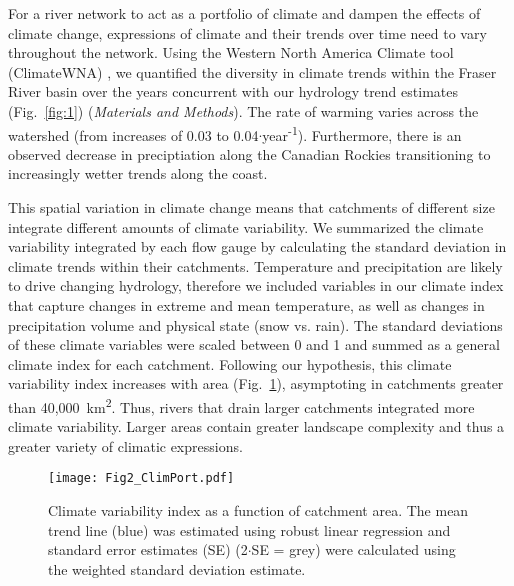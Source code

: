 \documentclass[9pt,twocolumn,twoside,lineno]{pnas-new}
\begin{document}
For a river network to act as a portfolio of climate and dampen the effects of climate change, expressions of climate and their trends over time need to vary throughout the network. Using the Western North America Climate tool (ClimateWNA) \cite{Wang:2016}, we quantified the diversity in climate trends within the Fraser River basin over the years concurrent with our hydrology trend estimates (Fig.~\ref{fig:1}) (\textit{Materials and Methods}). The rate of warming varies across the watershed (from increases of 0.03 to 0.04\celsius$\cdot$year\textsuperscript{-1}). Furthermore, there is an observed decrease in preciptiation along the Canadian Rockies transitioning to increasingly wetter trends along the coast.

This spatial variation in climate change means that catchments of different size integrate different amounts of climate variability. We summarized the climate variability integrated by each flow gauge by calculating the standard deviation in climate trends within their catchments. Temperature and precipitation are likely to drive changing hydrology, therefore we included variables in our climate index that capture changes in extreme and mean temperature, as well as changes in precipitation volume and physical state (snow vs. rain). The standard deviations of these climate variables were scaled between 0 and 1 and summed as a general climate index for each catchment. Following our hypothesis, this climate variability index increases with area (Fig.~\ref{fig:2}), asymptoting in catchments greater than 40,000~km\textsuperscript{2}. Thus, rivers that drain larger catchments integrated more climate variability. Larger areas contain greater landscape complexity and thus a greater variety of climatic expressions.

\begin{figure}[h]
\centering
\texttt{[image: Fig2\_ClimPort.pdf]}
	\caption{Climate variability index as a function of catchment area. The mean trend line (blue) was estimated using robust linear regression and standard error estimates (SE) (2$\cdot$SE = grey) were calculated using the weighted standard deviation estimate.}
\label{fig:2}
\end{figure}
\end{document}
